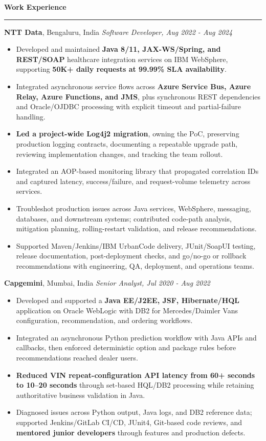 \documentclass[11pt,letterpaper]{article}
\newcommand{\ressection}[1]{\Needspace{6\baselineskip}\vspace{8pt}\par\textbf{#1}\par\vspace{2pt}\hrule\vspace{5pt}}
\begin{document}
\ressection{Work Experience}
\textbf{NTT Data}, Bengaluru, India \hfill \textit{Software Developer, Aug 2022 - Aug 2024}
\begin{itemize}
  \item Developed and maintained \textbf{Java 8/11, JAX-WS/Spring, and REST/SOAP} healthcare integration services on IBM WebSphere, supporting \textbf{50K+ daily requests at 99.99\% SLA availability}.
  \item Integrated asynchronous service flows across \textbf{Azure Service Bus, Azure Relay, Azure Functions, and JMS}, plus synchronous REST dependencies and Oracle/OJDBC processing with explicit timeout and partial-failure handling.
  \item \textbf{Led a project-wide Log4j2 migration}, owning the PoC, preserving production logging contracts, documenting a repeatable upgrade path, reviewing implementation changes, and tracking the team rollout.
  \item Integrated an AOP-based monitoring library that propagated correlation IDs and captured latency, success/failure, and request-volume telemetry across services.
  \item Troubleshot production issues across Java services, WebSphere, messaging, databases, and downstream systems; contributed code-path analysis, mitigation planning, rolling-restart validation, and release recommendations.
  \item Supported Maven/Jenkins/IBM UrbanCode delivery, JUnit/SoapUI testing, release documentation, post-deployment checks, and go/no-go or rollback recommendations with engineering, QA, deployment, and operations teams.
\end{itemize}
\textbf{Capgemini}, Mumbai, India \hfill \textit{Senior Analyst, Jul 2020 - Aug 2022}
\begin{itemize}
  \item Developed and supported a \textbf{Java EE/J2EE, JSF, Hibernate/HQL} application on Oracle WebLogic with DB2 for Mercedes/Daimler Vans configuration, recommendation, and ordering workflows.
  \item Integrated an asynchronous Python prediction workflow with Java APIs and callbacks, then enforced deterministic option and package rules before recommendations reached dealer users.
  \item \textbf{Reduced VIN repeat-configuration API latency from 60+ seconds to 10--20 seconds} through set-based HQL/DB2 processing while retaining authoritative business validation in Java.
  \item Diagnosed issues across Python output, Java logs, and DB2 reference data; supported Jenkins/GitLab CI/CD, JUnit4, Git-based code reviews, and \textbf{mentored junior developers} through features and production defects.
\end{itemize}
\end{document}
